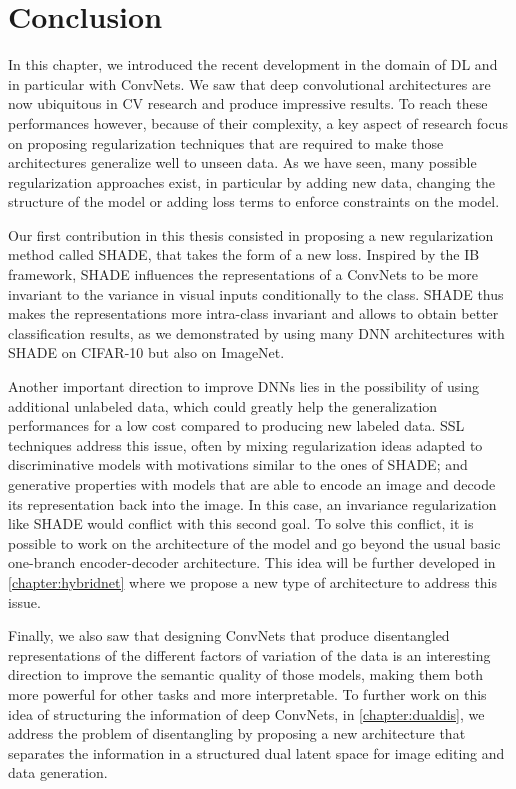 \section{Conclusion}

    In this chapter, we introduced the recent development in the domain of \acf{DL} and in particular with \acfp{ConvNet}. We saw that deep convolutional architectures are now ubiquitous in \acf{CV} research and produce impressive results. To reach these performances however, because of their complexity, a key aspect of research focus on proposing regularization techniques that are required to make those architectures generalize well to unseen data. As we have seen, many possible regularization approaches exist, in particular by adding new data, changing the structure of the model or adding loss terms to enforce constraints on the model.

    Our first contribution in this thesis consisted in proposing a new regularization method called \ac{SHADE}, that takes the form of a new loss. Inspired by the \acf{IB} framework, \ac{SHADE} influences the representations of a \acp{ConvNet} to be more invariant to the variance in visual inputs conditionally to the class. \ac{SHADE} thus makes the representations more intra-class invariant and allows to obtain better classification results, as we demonstrated by using many \ac{DNN} architectures with \ac{SHADE} on CIFAR-10 but also on ImageNet.

    Another important direction to improve \acp{DNN} lies in the possibility of using additional unlabeled data, which could greatly help the generalization performances for a low cost compared to producing new labeled data. \acf{SSL} techniques address this issue, often by mixing regularization ideas adapted to discriminative models with motivations similar to the ones of \ac{SHADE}; and generative properties with models that are able to encode an image and decode its representation back into the image. In this case, an invariance regularization like \ac{SHADE} would conflict with this second goal. To solve this conflict, it is possible to work on the architecture of the model and go beyond the usual basic one-branch encoder-decoder architecture. This idea will be further developed in \autoref{chapter:hybridnet} where we propose a new type of architecture to address this issue.

    Finally, we also saw that designing \acp{ConvNet} that produce disentangled representations of the different factors of variation of the data is an interesting direction to improve the semantic quality of those models, making them both more powerful for other tasks and more interpretable. To further work on this idea of structuring the information of deep \acp{ConvNet}, in \autoref{chapter:dualdis}, we address the problem of disentangling by proposing a new architecture that separates the information in a structured dual latent space for image editing and data generation.
